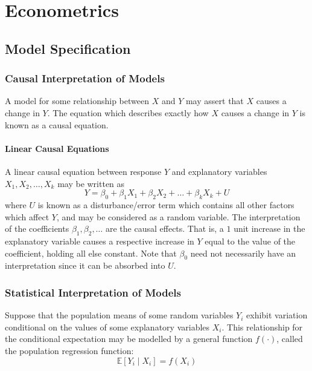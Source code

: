 \documentclass[11pt]{report} %
\begin{document}
\chapter{Econometrics}

\section{Model Specification}

\subsection{Causal Interpretation of Models}

A model for some relationship between $X$ and $Y$ may assert that $X$ causes a change in $Y$. The equation which describes exactly how $X$ causes a change in $Y$ is known as a causal equation.

\subsubsection{Linear Causal Equations}

A linear causal equation between response $Y$ and explanatory variables $X_{1}, X_{2}, \dots, X_{k}$ may be written as
\begin{equation}
Y = \beta_{0} + \beta_{1}X_{1} + \beta_{2}X_{2} + \dots + \beta_{k}X_{k} + U
\end{equation}
where $U$ is known as a disturbance/error term which contains all other factors which affect $Y$, and may be considered as a random variable. The interpretation of the coefficients $\beta_{1}, \beta_{2}, \dots$ are the causal effects. That is, a $1$ unit increase in the explanatory variable causes a respective increase in $Y$ equal to the value of the coefficient, holding all else constant. Note that $\beta_{0}$ need not necessarily have an interpretation since it can be absorbed into $U$.

\subsection{Statistical Interpretation of Models}

Suppose that the population means of some random variables $Y_{i}$ exhibit variation conditional on the values of some explanatory variables $X_{i}$. This relationship for the conditional expectation may be modelled by a general function $f\left(\cdot\right)$, called the population regression function:
\begin{equation}
\mathbb{E}\left[Y_{i}\middle|X_{i}\right] = f\left(X_{i}\right)
\end{equation}
\end{document}
